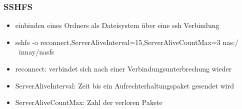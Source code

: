 \begin{frame}
\frametitle{SSHFS}
\begin{itemize}
\item einbinden eines Ordners als Dateisystem über eine ssh Verbindung
\item sshfs -o reconnect,ServerAliveInterval=15,ServerAliveCountMax=3 nas:/ ~innay/nasfs
\item reconnect: verbindet sich nach einer Verbindungsunterbrechung wieder
\item ServerAliveInterval: Zeit bis ein Aufrechterhaltungspaket gesendet wird
\item ServerAliveCountMax: Zahl der verloren Pakete
\end{itemize}
\end{frame}